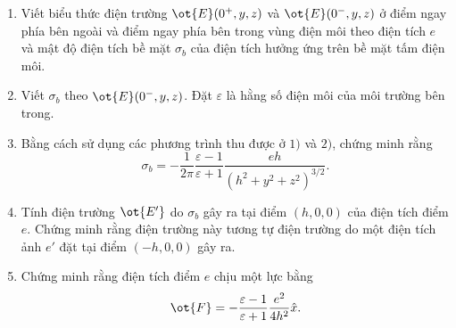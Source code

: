 \begin{vd}
\begin{center}
\begin{tikzpicture}[x=0.75pt,y=0.75pt,yscale=-1,xscale=1]
\end{tikzpicture}
\end{center}
\begin{enumerate}[1)]
\item Viết biểu thức điện trường $\ot{E} (0^+,y,z)$ và $\ot{E}(0^-,y,z)$ ở điểm ngay phía bên ngoài và điểm ngay phía bên trong vùng điện môi theo điện tích $e$ và mật độ điện tích bề mặt $\sigma_b$ của điện tích hưởng ứng trên bề mặt tấm điện môi.
\item Viết $\sigma_b$ theo $\ot{E}(0^-,y,z)$. Đặt $\varepsilon$ là hằng số điện môi của môi trường bên trong. 
\item Bằng cách sử dụng các phương trình thu được ở $1)$ và $2)$, chứng minh rằng
   $$\sigma_b = -\frac{1}{2\pi} \frac{\varepsilon -1}{\varepsilon +1} \frac {eh}{(h^2 + y^2 + z^2)^{3/2}}.$$ 
\item Tính điện trường $\ot{E'}$ do $\sigma_b$ gây ra tại điểm $(h,0,0)$ của điện tích điểm $e$. Chứng minh rằng điện trường này tương tự điện trường do một điện tích ảnh $e'$ đặt tại điểm $(-h,0,0)$ gây ra.
\item Chứng minh rằng điện tích điểm $e$ chịu một lực bằng
     $$\ot{F} = -\frac{\varepsilon -1}{\varepsilon +1} \frac{e^2}{4h^2}{\hat{x}}.$$
\end{enumerate}
\end{vd}
